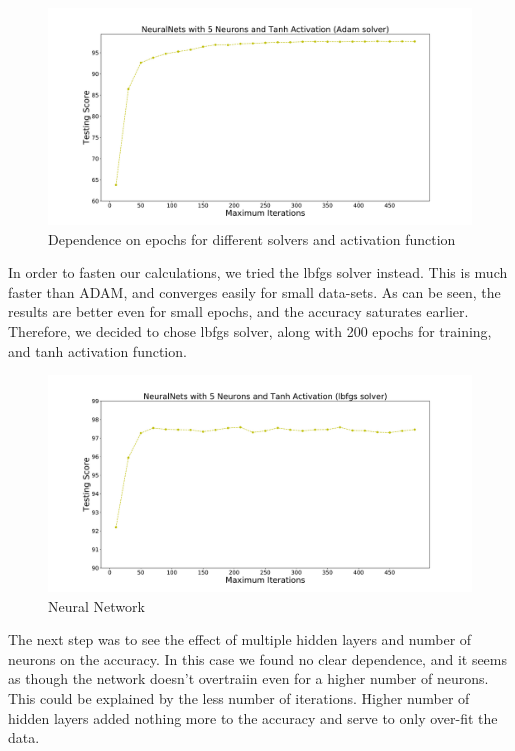 \begin{figure}[h]
\includegraphics[width=\onepic\textwidth]{plots/iter1}
\caption{
Dependence on epochs for different solvers and activation function
}
\label{fig:Maps_data}
\end{figure}

In order to fasten our calculations, we tried the lbfgs solver instead. This is much faster than ADAM, and converges easily for small data-sets. As can be seen, the results are better even for small epochs, and the accuracy saturates earlier. Therefore, we decided to chose lbfgs solver, along with 200 epochs for training, and tanh activation function. \\
\begin{figure}[h]
\includegraphics[width=\onepic\textwidth]{plots/iter2.pdf}
\caption{
Neural Network
}
\label{fig:Maps_data}
\end{figure}

The next step was to see the effect of multiple hidden layers and number of neurons on the accuracy. In this case we found no clear dependence, and it seems as though the network doesn't overtraiin even for a higher number of neurons. This could be explained by the less number of iterations. Higher number of hidden layers added nothing more to the accuracy and serve to only over-fit the data.\\


